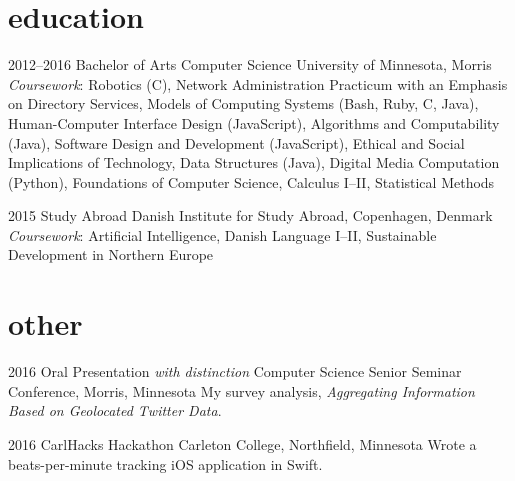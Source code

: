 \documentclass[]{cv-style} %
\begin{document}
\vspace{-0.2cm}
\section{education}

\begin{entrylist}


\entry
{2012--2016}
{Bachelor of Arts {\normalfont Computer Science}}
{University of Minnesota, Morris}
{\emph{Coursework}: \footnotesize{Robotics (C), Network Administration Practicum with an Emphasis on Directory Services, Models of Computing Systems (Bash, Ruby, C, Java), Human-Computer Interface Design (JavaScript), Algorithms and Computability (Java), Software Design and Development (JavaScript), Ethical and Social Implications of Technology, Data Structures (Java), Digital Media Computation (Python), Foundations of Computer Science, Calculus I--II, Statistical Methods}}

\entry
{2015}
{Study Abroad}
{Danish Institute for Study Abroad, Copenhagen, Denmark}
{\emph{Coursework}: \footnotesize{Artificial Intelligence, Danish Language I--II, Sustainable Development in Northern Europe}}

\end{entrylist}


\section{other}

\begin{entrylist}


\entry
{2016}
{Oral Presentation {\normalfont \emph{with distinction}}}
{Computer Science Senior Seminar Conference, Morris, Minnesota}
{My survey analysis, \emph{Aggregating Information Based on Geolocated Twitter Data}.}


\entry
{2016}
{CarlHacks Hackathon}
{Carleton College, Northfield, Minnesota}
{Wrote a beats-per-minute tracking iOS application in Swift.}


\end{entrylist}
\end{document}
